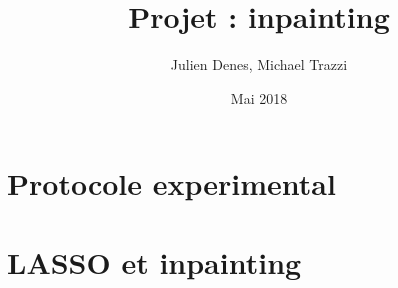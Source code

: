 \documentclass[a4paper]{article}
\title{Projet : inpainting}
\author{Julien Denes, Michael Trazzi}
\date{Mai 2018}
\begin{document}
\maketitle

\section*{Protocole experimental}

\section*{LASSO et inpainting}
\end{document}
